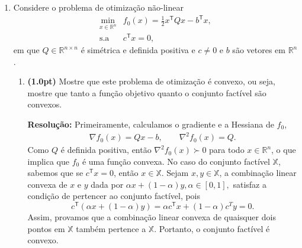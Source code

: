 \documentclass{article}
\newcommand{\R}{\mathbb{R}}
\newcommand{\T}{\mathsf{T}}
\begin{document}
\begin{enumerate}[resume*=exerc]
\item Considere o problema de otimização não-linear
\[
\begin{array}{rl}
\min_{x \in \R^n} & f_0(x) = \frac{1}{2} x^\T Q x - b^\T x,\\
\text{s.a} & c^\T x = 0,
\end{array}
\]
em que $Q \in \R^{n \times n}$ é simétrica e definida positiva e $c\neq 0$ e $b$ são vetores em $\R^n$.
\begin{enumerate}[label=(\alph*),series=q3]
\item {\bf (1.0pt)} Mostre que este problema de otimização é convexo, ou seja, mostre que tanto a função objetivo quanto o conjunto factível são convexos.
\begin{framed}
{\bf Resolução:}
Primeiramente, calculamos o gradiente e a Hessiana de $f_0$,
\begin{align*}
    \nabla f_0(x) = Q x - b,\qquad \nabla^2 f_0(x) = Q.
\end{align*}
Como $Q$ é definida positiva, então $\nabla^2 f_0(x) \succ 0$ para todo $x\in\R^n$, o que implica que $f_0$ é uma função convexa. No caso do conjunto factível $\mathbb{X}$, sabemos que se $c^\T x = 0$, então $x\in\mathbb{X}$. Sejam $x,y\in\mathbb{X}$, a combinação linear convexa de $x$ e $y$ dada por
$
    \alpha x + (1-\alpha) y, \alpha\in[0,1],
$
satisfaz a condição de pertencer ao conjunto factível, pois
\[c^\T(\alpha x + (1-\alpha) y) = \alpha c^\T x + (1-\alpha) c^T y = 0.\]
Assim, provamos que a combinação linear convexa de quaisquer dois pontos em $\mathbb{X}$ também pertence a $\mathbb{X}$. Portanto, o conjunto factível é convexo.
\end{framed}


\end{enumerate}
\end{enumerate}
\end{document}
